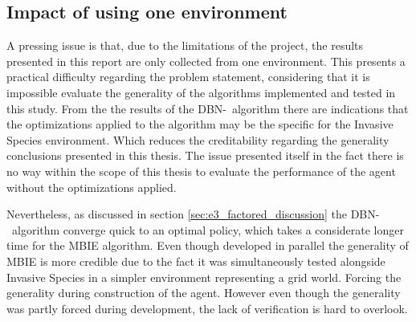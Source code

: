 \subsection{Impact of using one environment }
\label{sec:impact_of_one_env}
A pressing issue is that, due to the limitations of the project, the results presented in this report are only collected from one environment. This presents a practical difficulty regarding the problem statement, considering that it is impossible evaluate the generality of the algorithms implemented and tested in this study. From the the results of the DBN-\etre\ algorithm there are indications that the optimizations applied to the algorithm may be the specific for the Invasive Species environment. Which reduces the creditability regarding the generality conclusions presented in this thesis. The issue presented itself in the fact there is no way within the scope of this thesis to evaluate the performance of the agent without the optimizations applied. 

Nevertheless, as discussed in section \ref{sec:e3_factored_discussion} the DBN-\etre\ algorithm converge quick to an optimal policy, which takes a considerate longer time for the MBIE algorithm. Even though developed in parallel the generality of MBIE is more credible due to the fact it was simultaneously tested alongside Invasive Species in a simpler environment representing a grid world. Forcing the generality during construction of the agent. However even though the generality was partly forced during development, the lack of verification is hard to overlook.